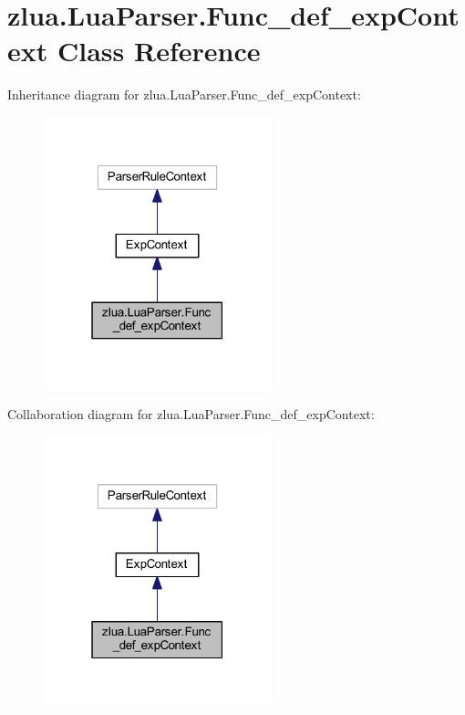 \hypertarget{classzlua_1_1_lua_parser_1_1_func__def__exp_context}{}\section{zlua.\+Lua\+Parser.\+Func\+\_\+def\+\_\+exp\+Context Class Reference}
\label{classzlua_1_1_lua_parser_1_1_func__def__exp_context}


Inheritance diagram for zlua.\+Lua\+Parser.\+Func\+\_\+def\+\_\+exp\+Context\+:
\nopagebreak
\begin{figure}[H]
\begin{center}
\leavevmode
\includegraphics[width=187pt]{classzlua_1_1_lua_parser_1_1_func__def__exp_context__inherit__graph}
\end{center}
\end{figure}


Collaboration diagram for zlua.\+Lua\+Parser.\+Func\+\_\+def\+\_\+exp\+Context\+:
\nopagebreak
\begin{figure}[H]
\begin{center}
\leavevmode
\includegraphics[width=187pt]{classzlua_1_1_lua_parser_1_1_func__def__exp_context__coll__graph}
\end{center}
\end{figure}
